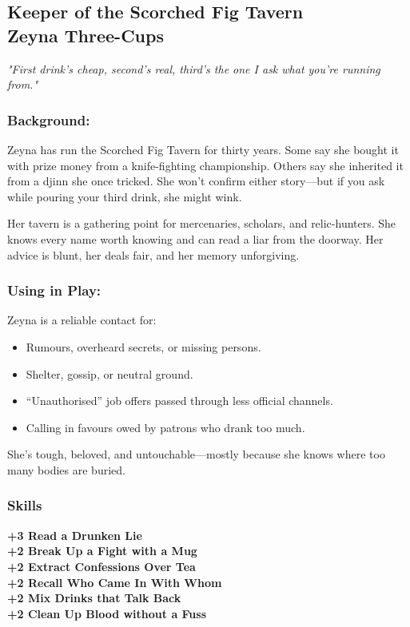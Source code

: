 \subsection{{\small Keeper of the Scorched Fig Tavern}\\ Zeyna Three-Cups}
\label{npc:zeyna-three-cups}

\emph{"First drink’s cheap, second’s real, third's the one I ask what you’re running from."}
\vspace{.5\baselineskip}

\begin{paracol}{3}
    \subsubsection*{Background:}
    Zeyna has run the Scorched Fig Tavern for thirty years. Some say she bought it with prize money from a knife-fighting championship. Others say she inherited it from a djinn she once tricked. She won’t confirm either story—but if you ask while pouring your third drink, she might wink.

    Her tavern is a gathering point for mercenaries, scholars, and relic-hunters. She knows every name worth knowing and can read a liar from the doorway. Her advice is blunt, her deals fair, and her memory unforgiving.

    \switchcolumn
    \subsubsection*{Using in Play:}
    Zeyna is a reliable contact for:
    \begin{itemize}
        \item Rumours, overheard secrets, or missing persons.
        \item Shelter, gossip, or neutral ground.
        \item “Unauthorised” job offers passed through less official channels.
        \item Calling in favours owed by patrons who drank too much.
    \end{itemize}

    She’s tough, beloved, and untouchable—mostly because she knows where too many bodies are buried.

    \switchcolumn
    \subsubsection{Skills}
        \noindent\textbf{+3 Read a Drunken Lie} \\
        \noindent\textbf{+2 Break Up a Fight with a Mug} \\
        \noindent\textbf{+2 Extract Confessions Over Tea} \\
        \noindent\textbf{+2 Recall Who Came In With Whom} \\
        \noindent\textbf{+2 Mix Drinks that Talk Back} \\
        \noindent\textbf{+2 Clean Up Blood without a Fuss}

\end{paracol}

